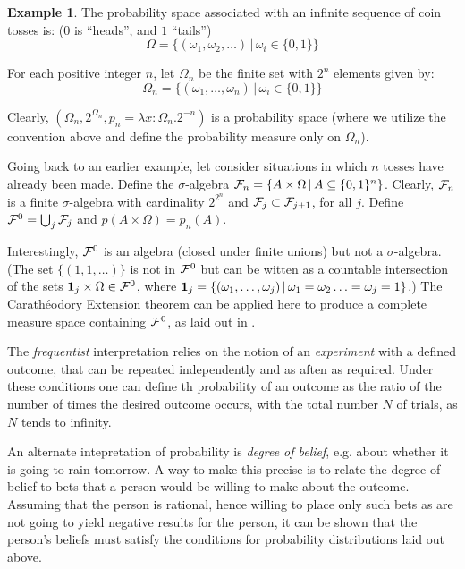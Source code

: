 \documentclass{article}
\newcommand{\alt}{\,|\,}
\theoremstyle{definition}
\newtheorem*{example}{Example}
\begin{document}
\begin{example}
  The probability space associated with an infinite sequence of coin tosses is: (\(0\) is ``heads'', and \(1\) ``tails'')
  \[ \Omega = \{(\omega_1, \omega_2, \ldots) \alt \omega_i \in \{0,1\}\}\]

  For each positive integer \(n\), let \(\Omega_n\) be the finite set with \(2^n\) elements given by:
  \[\Omega_n=\{(\omega_1, \ldots, \omega_n)\alt \omega_i \in \{0,1\}\}\]

  Clearly, \((\Omega_n, 2^{\Omega_n},p_n=\lambda x:\Omega_n.2^{-n})\) is a probability space (where we utilize the convention above and define the probability measure only on \(\Omega_n\)).

  Going back to an earlier example, let consider situations in which \(n\) tosses have already been made. Define the  \(\sigma\)-algebra \({\cal F}_n= \{A\times \Omega \alt A \subseteq \{0,1\}^n\}\).  Clearly, \({\cal F}_n\) is a finite \(\sigma\)-algebra with cardinality \(2^{2^n}\) and  \({\cal F}_j \subset {\cal F}_{j+1}\), for all \(j\). Define \({\cal F}^0=\bigcup_j {\cal F}_j\) and \(p(A\times \Omega)= p_n(A)\).

  Interestingly, \({\cal F}^0\) is an algebra (closed under finite unions) but not a \(\sigma\)-algebra. (The set \(\{(1,1,\ldots)\}\) is not in \({\cal F}^0\) but can be witten as a countable intersection of the sets \({\bf 1}_j \times \Omega\in {\cal F}^0\), where \({\bf 1}_j = \{(\omega_1,\ldots, \omega_j)\alt \omega_1=\omega_2\ldots=\omega_j=1\}\).) The Carath\'{e}odory Extension theorem can be applied here to produce a complete measure space containing  ${\cal F}^0$, as laid out in \cite{lawler}.
\end{example}

The {\em frequentist} interpretation relies on the notion of an {\em experiment} with a defined outcome, that can be repeated independently and as aften as required. Under these conditions one can define th probability of an outcome as the ratio of the number of times the desired outcome occurs, with the total number \(N\) of trials, as \(N\) tends to infinity.

An alternate intepretation of probability is {\em degree of belief}, e.g.{} about whether it is going to rain tomorrow.  A way to make this precise is to relate the degree of belief to bets that a person would be willing to make about the outcome. Assuming that the person is rational, hence willing to place only such bets as are not going to yield negative results for the person, it can be shown that the person's beliefs must satisfy the conditions for probability distributions laid out above.
\end{document}
